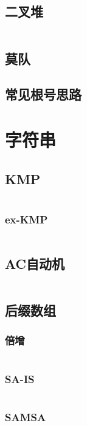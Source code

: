 \documentclass[a4paper, twoside]{article}
\begin{document}
\begin{multicols}{2}
				\subsection{二叉堆}
					\inputminted{cpp}{../src/datastructure/二叉堆.cpp}
			
			\subsection{莫队}
				
	
			\subsection{常见根号思路}
				

		\newpage
		\section{字符串}
			\subsection{KMP}
				\inputminted{cpp}{../src/string/KMP.cpp}
				
				\subsubsection{ex-KMP}
					\inputminted{cpp}{../src/string/exKMP.cpp}

			\subsection{AC自动机}
				\inputminted{cpp}{../src/string/AC自动机.cpp}

			\subsection{后缀数组}
				\subsubsection{倍增}
					\inputminted{cpp}{../src/string/sa.cpp}	

				\subsubsection{SA-IS}
					\inputminted{cpp}{../src/string/sais.cpp}
			
				\subsubsection{SAMSA}
				 	\inputminted{cpp}{../src/string/SAMSA.cpp}


\end{multicols}
\end{document}
